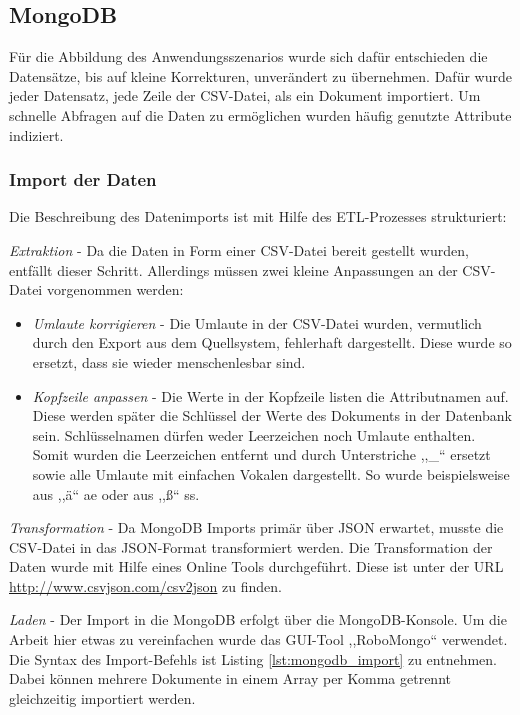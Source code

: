 \subsection{MongoDB}
Für die Abbildung des Anwendungsszenarios wurde sich dafür entschieden die Datensätze, bis auf kleine Korrekturen, unverändert zu übernehmen. Dafür wurde jeder Datensatz, jede Zeile der CSV-Datei, als ein Dokument importiert. Um schnelle Abfragen auf die Daten zu ermöglichen wurden häufig genutzte Attribute indiziert.

\subsubsection{Import der Daten}
Die Beschreibung des Datenimports ist mit Hilfe des ETL-Prozesses strukturiert:

\emph{Extraktion} -
Da die Daten in Form einer CSV-Datei bereit gestellt wurden, entfällt dieser Schritt. Allerdings müssen zwei kleine Anpassungen an der CSV-Datei vorgenommen werden:

\begin{itemize}
\item \textit{Umlaute korrigieren} - Die Umlaute in der CSV-Datei wurden, vermutlich durch den Export aus dem Quellsystem, fehlerhaft dargestellt. Diese wurde so ersetzt, dass sie wieder menschenlesbar sind.
\item \textit{Kopfzeile anpassen} - Die Werte in der Kopfzeile listen die Attributnamen auf. Diese werden später die Schlüssel der Werte des Dokuments in der Datenbank sein. Schlüsselnamen dürfen weder Leerzeichen noch Umlaute enthalten. Somit wurden die Leerzeichen entfernt und durch Unterstriche ,,\_`` ersetzt sowie alle Umlaute mit einfachen Vokalen dargestellt. So wurde beispielsweise aus ,,\"a`` ae oder aus ,,\ss{}`` ss.
\end{itemize}

\emph{Transformation} -
Da MongoDB Imports primär über JSON erwartet, musste die CSV-Datei in das JSON-Format transformiert werden. Die Transformation der Daten wurde mit Hilfe eines Online Tools durchgeführt. Diese ist unter der URL \url{http://www.csvjson.com/csv2json} zu finden.

\emph{Laden} -
Der Import in die MongoDB erfolgt über die MongoDB-Konsole. Um die Arbeit hier etwas zu vereinfachen wurde das GUI-Tool ,,RoboMongo`` verwendet. Die Syntax des Import-Befehls ist Listing \ref{lst:mongodb_import} zu entnehmen. Dabei können mehrere Dokumente in einem Array per Komma getrennt gleichzeitig importiert werden. \\

